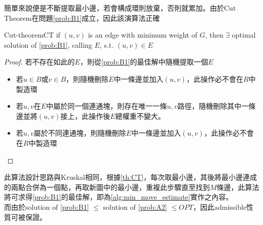 \documentclass[a4paper, 12pt]{article}  %
\begin{document}
簡單來說便是不斷提取最小邊，若會構成環則放棄，否則就累加。由於Cut Theorem在問題\ref{prob:B1}成立，因此該演算法正確

\begin{mytheorem}{Cut-theorem}{CT}
if $(u,v)$ is an edge with minimum weight of $G$, then $\exists$ optimal solution of \ref{prob:B1}, calling $E$, s.t. $(u,v)\in E$
\end{mytheorem}

\begin{proof}
    若不存在如此的$E$，則從\ref{prob:B1}的最佳解中隨機提取一個$E$
    \begin{itemize}
        \item 若$u\in B$或$v\in B$，則隨機刪除$E$中一條邊並加入$(u,v)$，此操作必不會在$R$中製造環
        \item 若$u,v$在$E$中屬於同一個連通塊，則存在唯一一條$u,v$路徑，隨機刪除其中一條邊並將$(u,v)$接上，此操作後$E$總權重不變大。
        \item 若$u,v$屬於不同連通塊，則隨機刪除$E$中一條邊並加入$(u,v)$，此操作必不會在$R$中製造環
    \end{itemize}
\end{proof}

此算法設計思路與Kruskal相同，根據\ref{th:CT}，每次取最小邊，其後將最小邊連成的兩點合併為一個點，再取新圖中的最小邊，重複此步驟直至找到$M$條邊，此算法將可求得\ref{prob:B1}的最佳解，即為\ref{alg:min_move_estimate}實作之內容。\\
而由於solution of \ref{prob:B1} $\le$ solution of \ref{prob:A2} $\le OPT$，因此admissible性質可被保證。 


\end{document}
